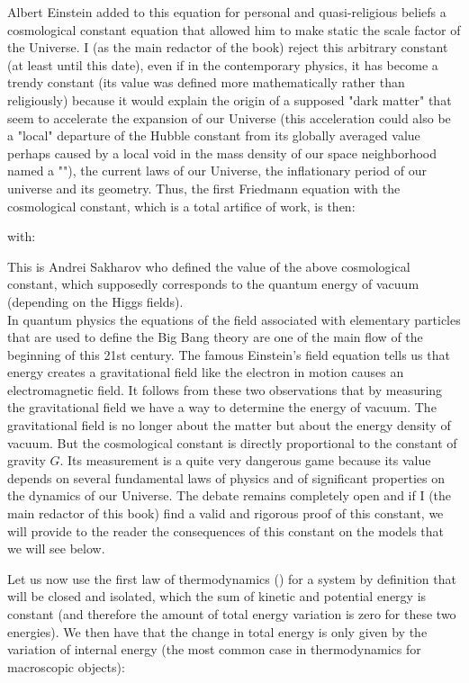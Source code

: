 	\pagebreak
	\begin{tcolorbox}[title=Remark,colframe=black,arc=10pt]
	Albert Einstein added to this equation for personal and quasi-religious beliefs a cosmological constant equation that allowed him to make static the scale factor of the Universe. I (as the main redactor of the book) reject this arbitrary constant (at least until this date), even if in the contemporary physics, it has become a trendy constant (its value was defined more mathematically rather than religiously) because it would explain the origin of a supposed "dark matter" that seem to accelerate the expansion of our Universe (this acceleration could also be a "local" departure of the Hubble constant from its globally averaged value perhaps caused by a local void in the mass density of our space neighborhood named a ""), the current laws of our Universe, the inflationary period of our universe and its geometry. Thus, the first Friedmann equation with the cosmological constant, which is a total artifice of work, is then: 
	
	with:
	
	This is Andrei Sakharov who defined the value of the above cosmological constant, which supposedly corresponds to the quantum energy of vacuum (depending on the Higgs fields).\\
	
	In quantum physics the equations of the field associated with elementary particles that are used to define the Big Bang theory are one of the main flow of the beginning of this 21st century. The famous Einstein's field equation tells us that energy creates a gravitational field like the electron in motion causes an electromagnetic field. It follows from these two observations that by measuring the gravitational field we have a way to determine the energy of vacuum. The gravitational field is no longer about the matter but about the energy density of vacuum. But the cosmological constant is directly proportional to the constant of gravity $G$. Its measurement is a quite very dangerous game because its value depends on several fundamental laws of physics and of significant properties on the dynamics of our Universe. The debate remains completely open and if I (the main redactor of this book) find a valid and rigorous proof of this constant, we will provide to the reader the  consequences of this constant on the models that we will see below.
	\end{tcolorbox}
	Let us now use the first law of thermodynamics () for a system by definition that will be closed and isolated, which the sum of kinetic and potential energy is constant (and therefore the amount of total energy variation is zero for these two energies). We then have that the change in total energy is only given by the variation of internal energy (the most common case in thermodynamics for macroscopic objects):
	
